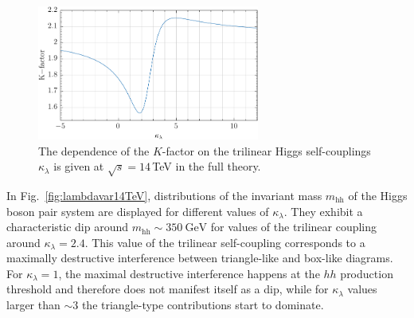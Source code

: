 \documentclass[a4paper]{jpconf}
\newcommand{\GeV}{\ensuremath{\mathrm{\:GeV}}}
\newcommand{\chhh}{\ensuremath{\kappa_{\lambda}}}
\begin{document}
\begin{figure}[htb!]
  \centering
    \includegraphics[width=0.65\textwidth]{figures/Kfactor.pdf}
\caption{The dependence of the $K$-factor on the trilinear Higgs self-couplings $\chhh$ is given at $\sqrt{s}=14$\,TeV in the full theory.}
\label{fig:Kfacvariation}
\end{figure}

In Fig.~\ref{fig:lambdavar14TeV}, distributions of the invariant mass $m_{\mathrm{hh}}$ of the Higgs boson pair system are displayed for different values of $\chhh$. They exhibit a characteristic dip around $m_{\mathrm{hh}} \sim 350 \GeV$ for values of the trilinear coupling around $\chhh = 2.4$. This value of the trilinear self-coupling corresponds to a maximally destructive interference between triangle-like and box-like diagrams. For $\chhh = 1$, the maximal destructive interference happens at the $hh$ production threshold and therefore does not manifest itself as a dip, while  for $\chhh$ values larger than $\sim 3$ the triangle-type contributions start to dominate.
\end{document}
